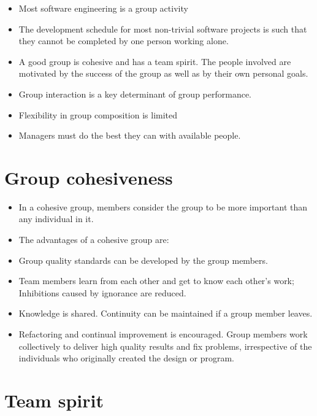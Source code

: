 \begin{itemize}

\item Most software engineering is a group activity

  \item The development schedule for most non-trivial software projects is such that they cannot be completed by one person working alone.

\item A good group is cohesive and has a team spirit. The people involved are motivated by the success of the group as well as by their own personal goals.

\item Group interaction is a key determinant of group performance.

\item Flexibility in group composition is limited

  \item Managers must do the best they can with available people.

\end{itemize} \section{ Group cohesiveness}
\begin{itemize}

\item In a cohesive group, members consider the group to be more important than any individual in it.

\item The advantages of a cohesive group are:

  \item Group quality standards can be developed by the group members.
  \item Team members learn from each other and get to know each other’s work; Inhibitions caused by ignorance are reduced.
  \item Knowledge is shared. Continuity can be maintained if a group member leaves.
  \item Refactoring and continual improvement is encouraged. Group members work collectively to deliver high quality results and fix problems, irrespective of the individuals who originally created the design or program.
\end{itemize}
 \section{ Team spirit}


